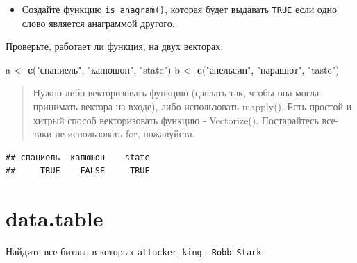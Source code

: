 \documentclass[]{book}
\newenvironment{Shaded}{\begin{snugshade}}{\end{snugshade}}
\newcommand{\KeywordTok}[1]{\textcolor[rgb]{0.13,0.29,0.53}{\textbf{#1}}}
\newcommand{\StringTok}[1]{\textcolor[rgb]{0.31,0.60,0.02}{#1}}
\newcommand{\NormalTok}[1]{#1}
\providecommand{\tightlist}{%
  \setlength{\itemsep}{0pt}\setlength{\parskip}{0pt}}
\begin{document}
\begin{itemize}
\tightlist
\item
  Создайте функцию \texttt{is\_anagram()}, которая будет выдавать
  \texttt{TRUE} если одно слово является анаграммой другого.
\end{itemize}

Проверьте, работает ли функция, на двух векторах:

\begin{Shaded}
\begin{Highlighting}[]
\NormalTok{a <-}\StringTok{ }\KeywordTok{c}\NormalTok{(}\StringTok{"спаниель"}\NormalTok{, }\StringTok{"капюшон"}\NormalTok{, }\StringTok{"state"}\NormalTok{)}
\NormalTok{b <-}\StringTok{ }\KeywordTok{c}\NormalTok{(}\StringTok{"апельсин"}\NormalTok{, }\StringTok{"парашют"}\NormalTok{, }\StringTok{"taste"}\NormalTok{)}
\end{Highlighting}
\end{Shaded}

\begin{quote}
Нужно либо векторизовать функцию (сделать так, чтобы она могла принимать
вектора на входе), либо использовать mapply(). Есть простой и хитрый
способ векторизовать функцию - Vectorize(). Постарайтесь все-таки не
использовать for, пожалуйста.
\end{quote}

\begin{verbatim}
## спаниель  капюшон    state 
##     TRUE    FALSE     TRUE
\end{verbatim}

\section{data.table}\label{dt_task}

Найдите все битвы, в которых \texttt{attacker\_king} -
\texttt{Robb\ Stark}.
\end{document}
